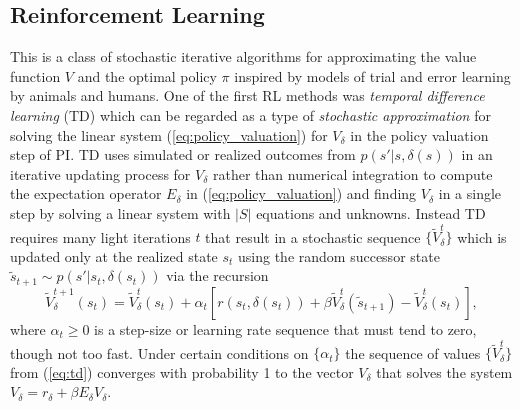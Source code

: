 \subsection{Reinforcement Learning}

This is a class of stochastic iterative algorithms for approximating the value function $V$ and the optimal
policy $\pi$ inspired by models of trial and error learning by animals and humans. One of the first RL methods was 
{\it temporal difference learning\/} (TD) \citet{sutton:1988} which can be regarded as a type of 
{\it stochastic approximation\/} \citep{robbinsmunro:1951} for solving the linear system (\ref{eq:policy_valuation}) for
$V_\delta$ in the policy valuation step of PI. TD uses simulated or realized outcomes from $p(s'|s,\delta(s))$
in an iterative updating process for $V_\delta$ rather than numerical
integration to compute the expectation operator $E_\delta$ in (\ref{eq:policy_valuation})
and finding $V_\delta$ in a single step by solving a linear system with $|S|$ equations and unknowns.
Instead TD requires many light iterations $t$ that result in a stochastic sequence $\{\tilde V^t_\delta\}$ 
which is updated only at the realized state $s_t$ using the random successor state $\tilde s_{t+1} \sim p(s'|s_t,\delta(s_t))$ via the
recursion
\begin{equation}
              \tilde V^{t+1}_\delta(s_t)= \tilde V^t_\delta(s_t)+ \alpha_t\left[r(s_t,\delta(s_t))+\beta \tilde V^t_\delta(\tilde s_{t+1})-
\tilde V^t_\delta(s_t)\right],
\label{eq:td}
\end{equation}
where $\alpha_t \ge 0$ is a step-size or learning rate sequence that must tend to zero, though not too fast. Under certain conditions
on $\{\alpha_t\}$ the sequence of values $\{\tilde V^t_\delta\}$ from (\ref{eq:td})
 converges with probability 1 to the vector $V_\delta$ that solves the system $V_\delta=r_\delta+
\beta E_\delta V_\delta$.

